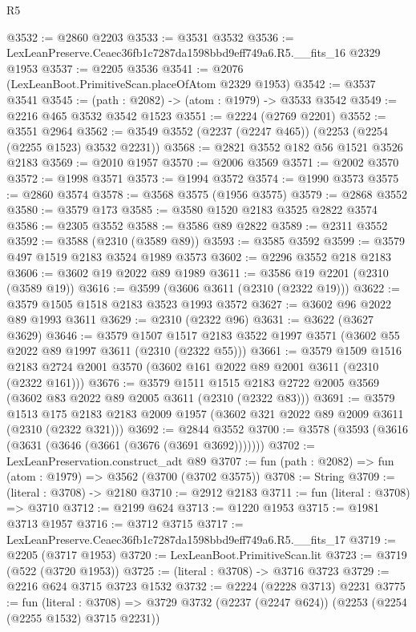 \begin{lexlean}{R5}
\begin{coremodule}
@3532 := @2860 @2203
@3533 := @3531 @3532
@3536 := LexLeanPreserve.Ceaec36fb1c7287da1598bbd9eff749a6.R5.__fits_16 @2329 @1953
@3537 := @2205 @3536
@3541 := @2076 (LexLeanBoot.PrimitiveScan.placeOfAtom @2329 @1953)
@3542 := @3537 @3541
@3545 := (path : @2082) -> (atom : @1979) -> @3533 @3542
@3549 := @2216 @465 @3532 @3542 @1523
@3551 := @2224 (@2769 @2201)
@3552 := @3551 @2964
@3562 := @3549 @3552 (@2237 (@2247 @465)) (@2253 (@2254 (@2255 @1523) @3532 @2231))
@3568 := @2821 @3552 @182 @56 @1521 @3526 @2183
@3569 := @2010 @1957
@3570 := @2006 @3569
@3571 := @2002 @3570
@3572 := @1998 @3571
@3573 := @1994 @3572
@3574 := @1990 @3573
@3575 := @2860 @3574
@3578 := @3568 @3575 (@1956 @3575)
@3579 := @2868 @3552
@3580 := @3579 @173
@3585 := @3580 @1520 @2183 @3525 @2822 @3574
@3586 := @2305 @3552
@3588 := @3586 @89 @2822
@3589 := @2311 @3552
@3592 := @3588 (@2310 (@3589 @89))
@3593 := @3585 @3592
@3599 := @3579 @497 @1519 @2183 @3524 @1989 @3573
@3602 := @2296 @3552 @218 @2183
@3606 := @3602 @19 @2022 @89 @1989
@3611 := @3586 @19 @2201 (@2310 (@3589 @19))
@3616 := @3599 (@3606 @3611 (@2310 (@2322 @19)))
@3622 := @3579 @1505 @1518 @2183 @3523 @1993 @3572
@3627 := @3602 @96 @2022 @89 @1993 @3611
@3629 := @2310 (@2322 @96)
@3631 := @3622 (@3627 @3629)
@3646 := @3579
    @1507
    @1517
    @2183
    @3522
    @1997
    @3571
    (@3602 @55 @2022 @89 @1997 @3611 (@2310 (@2322 @55)))
@3661 := @3579
    @1509
    @1516
    @2183
    @2724
    @2001
    @3570
    (@3602 @161 @2022 @89 @2001 @3611 (@2310 (@2322 @161)))
@3676 := @3579
    @1511
    @1515
    @2183
    @2722
    @2005
    @3569
    (@3602 @83 @2022 @89 @2005 @3611 (@2310 (@2322 @83)))
@3691 := @3579
    @1513
    @175
    @2183
    @2183
    @2009
    @1957
    (@3602 @321 @2022 @89 @2009 @3611 (@2310 (@2322 @321)))
@3692 := @2844 @3552
@3700 := @3578 (@3593 (@3616 (@3631 (@3646 (@3661 (@3676 (@3691 @3692)))))))
@3702 := LexLeanPreservation.construct_adt @89
@3707 := fun (path : @2082) => fun (atom : @1979) => @3562 (@3700 (@3702 @3575))
@3708 := String
@3709 := (literal : @3708) -> @2180
@3710 := @2912 @2183
@3711 := fun (literal : @3708) => @3710
@3712 := @2199 @624
@3713 := @1220 @1953
@3715 := @1981 @3713 @1957
@3716 := @3712 @3715
@3717 := LexLeanPreserve.Ceaec36fb1c7287da1598bbd9eff749a6.R5.__fits_17
@3719 := @2205 (@3717 @1953)
@3720 := LexLeanBoot.PrimitiveScan.lit
@3723 := @3719 (@522 (@3720 @1953))
@3725 := (literal : @3708) -> @3716 @3723
@3729 := @2216 @624 @3715 @3723 @1532
@3732 := @2224 (@2228 @3713) @2231
@3775 := fun (literal : @3708) =>
  @3729
    @3732
    (@2237 (@2247 @624))
    (@2253 (@2254 (@2255 @1532) @3715 @2231))

\end{coremodule}
\end{lexlean}
